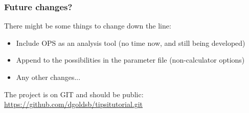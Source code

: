 \documentclass[hyperref={pdfpagelabels=false}]{beamer}
\begin{document}
\begin{frame}
\frametitle{Future changes?}
There might be some things to change down the line:
\begin{itemize}
\item Include OPS as an analysis tool (no time now, and still being developed)
\item Append to the possibilities in the parameter file (non-calculator options)
\item Any other changes...
\end{itemize} 
The project is on GIT and should be public: \url{https://github.com/dgoldsb/tipsitutorial.git}
\end{frame}
\end{document}
